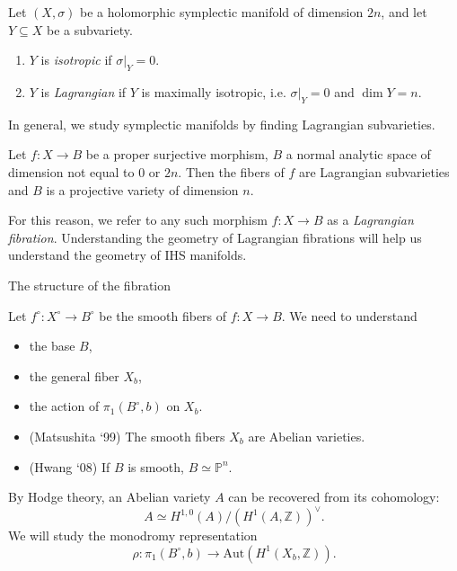 \documentclass{beamer}
\begin{document}
\begin{frame}

\begin{definition}
    Let \((X, \sigma)\) be a holomorphic symplectic manifold of dimension \(2n\), and 
    let \(Y \subseteq X\) be a subvariety. 
    \begin{enumerate}
        \item \(Y\) is {\it isotropic} if \(\sigma|_Y = 0\).
        \item \(Y\) is {\it Lagrangian} if \(Y\) is maximally isotropic, i.e. 
        \(\sigma|_Y = 0\) and \(\dim Y = n\).
    \end{enumerate}
\end{definition}

\pause
In general, we study symplectic manifolds by finding Lagrangian subvarieties.
\pause

\begin{theorem}
    Let \(f: X \to B\) be a proper surjective morphism, \(B\) a normal analytic space of 
    dimension not equal to \(0\) or \(2n\). Then the fibers of \(f\) are Lagrangian
    subvarieties and \(B\) is a projective variety of dimension \(n\).
\end{theorem}

\pause
For this reason, we refer to any such morphism \(f: X \to B\) as a 
{\it Lagrangian fibration}. Understanding the geometry of Lagrangian fibrations 
will help us understand the geometry of IHS manifolds.

\end{frame}



\begin{frame}{The structure of the fibration}

Let \(f^\circ: X^\circ \to B^\circ\) be the smooth fibers of \(f: X \to B\). 
We need to understand 
\begin{itemize}
    \item the base \(B\),
    \item the general fiber \(X_b\),
    \item the action of \(\pi_1(B^\circ, b)\) on \(X_b\).
\end{itemize}
\pause

\begin{theorem}
    \begin{itemize}
        \item (Matsushita `99) The smooth fibers \(X_b\) are Abelian varieties. \pause
        \item (Hwang `08) If \(B\) is smooth, \(B \simeq \mathbb{P}^n\).
    \end{itemize}
\end{theorem}

\pause
By Hodge theory, an Abelian variety \(A\) can be recovered from its cohomology:
\begin{equation*}
    A \simeq H^{1,0}(A) / (H^1(A, \mathbb{Z}))^\vee.
\end{equation*}
We will study the monodromy representation 
\[\rho: \pi_1(B^\circ, b) \to \mathrm{Aut}(H^1(X_b, \mathbb{Z})).\]


\end{frame}
\end{document}
